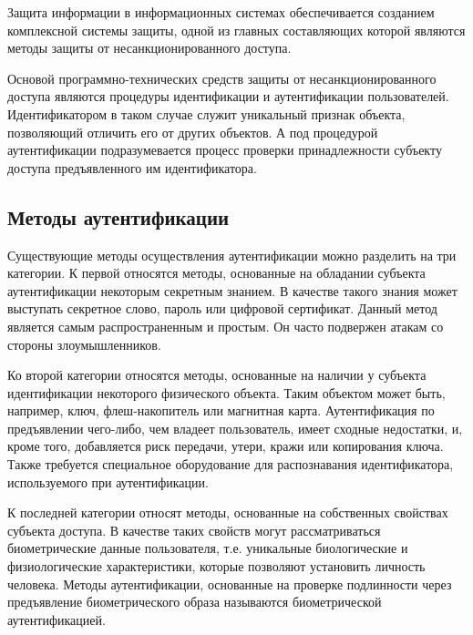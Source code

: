 \documentclass[12pt]{article}
\begin{document}
    \par Защита информации в информационных системах обеспечивается созданием комплексной системы защиты, одной из главных составляющих которой являются методы защиты от несанкционированного доступа. \\

    \par Основой программно-технических средств защиты от несанкционированного доступа являются процедуры идентификации и аутентификации пользователей. Идентификатором в таком случае служит уникальный признак объекта, позволяющий отличить его от других объектов. А под процедурой аутентификации подразумевается процесс проверки принадлежности субъекту доступа предъявленного им идентификатора. \\


    \subsection{Методы аутентификации}
    \label{sec:Intro:ApplicationArea:AuthenticationMethods}

    \par Существующие методы осуществления аутентификации можно разделить на три категории. К первой относятся методы, основанные на обладании субъекта аутентификации некоторым секретным знанием. В качестве такого знания может выступать секретное слово, пароль или цифровой сертификат. Данный метод является самым распространенным и простым. Он часто подвержен атакам со стороны злоумышленников. \\

    \par Ко второй категории относятся методы, основанные на наличии у субъекта идентификации некоторого физического объекта. Таким объектом может быть, например, ключ, флеш-накопитель или магнитная карта. Аутентификация по предъявлении чего-либо, чем владеет пользователь, имеет сходные недостатки, и, кроме того, добавляется риск передачи, утери, кражи или копирования ключа. Также требуется специальное оборудование для распознавания идентификатора, используемого при аутентификации. \\

    \par К последней категории относят методы, основанные на собственных свойствах субъекта доступа. В качестве таких свойств могут рассматриваться биометрические данные пользователя, т.е. уникальные биологические и физиологические характеристики, которые позволяют установить личность человека. Методы аутентификации, основанные на проверке подлинности через предъявление биометрического образа называются биометрической аутентификацией. \\
\end{document}
